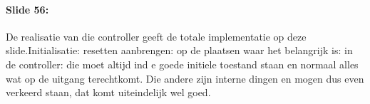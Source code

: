 \documentclass[10pt,a4paper]{book}
\begin{document}
\paragraph{Slide 56:} De realisatie van die controller geeft de totale implementatie op deze slide.Initialisatie: resetten aanbrengen: op de plaatsen waar het belangrijk is: in de controller: die moet altijd ind e goede initiele toestand staan en normaal alles wat op de uitgang terechtkomt. Die andere zijn interne dingen en mogen dus even verkeerd staan, dat komt uiteindelijk wel goed. 
\end{document}
